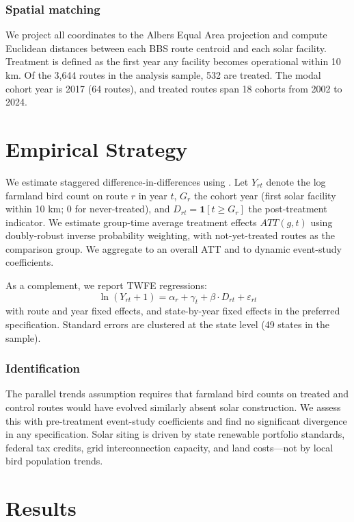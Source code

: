 \documentclass[12pt]{article}
\begin{document}
\subsubsection*{Spatial matching} We project all coordinates to the Albers Equal Area projection and compute Euclidean distances between each BBS route centroid and each solar facility. Treatment is defined as the first year any facility becomes operational within 10 km. Of the 3,644 routes in the analysis sample, 532 are treated. The modal cohort year is 2017 (64 routes), and treated routes span 18 cohorts from 2002 to 2024.

\section{Empirical Strategy}

We estimate staggered difference-in-differences using \citet{callaway2021}. Let $Y_{rt}$ denote the log farmland bird count on route $r$ in year $t$, $G_r$ the cohort year (first solar facility within 10 km; 0 for never-treated), and $D_{rt} = \mathbf{1}[t \geq G_r]$ the post-treatment indicator. We estimate group-time average treatment effects $ATT(g,t)$ using doubly-robust inverse probability weighting, with not-yet-treated routes as the comparison group. We aggregate to an overall ATT and to dynamic event-study coefficients.

As a complement, we report TWFE regressions:
\begin{equation}
\ln(Y_{rt} + 1) = \alpha_r + \gamma_t + \beta \cdot D_{rt} + \varepsilon_{rt}
\end{equation}
with route and year fixed effects, and state-by-year fixed effects in the preferred specification. Standard errors are clustered at the state level (49 states in the sample).

\subsubsection*{Identification} The parallel trends assumption requires that farmland bird counts on treated and control routes would have evolved similarly absent solar construction. We assess this with pre-treatment event-study coefficients and find no significant divergence in any specification. Solar siting is driven by state renewable portfolio standards, federal tax credits, grid interconnection capacity, and land costs---not by local bird population trends.

\section{Results}
\end{document}
